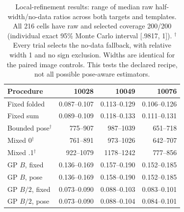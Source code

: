 \begin{table}[t]
\centering\scriptsize
\caption{Local-refinement results: range of median raw half-width/no-data ratios across both targets and templates. All 216 cells have raw and selected coverage 200/200 (individual exact 95\% Monte Carlo interval [.9817, 1]). $^\dagger$Every trial selects the no-data fallback, with relative width 1 and no sign exclusion. Widths are identical for the paired image controls. This tests the declared recipe, not all possible pose-aware estimators.}
\label{tab:refittingwidths}
\begin{tabular}{lrrr}
\toprule
Procedure & 10028 & 10049 & 10076 \\
\midrule
Fixed folded & 0.087--0.107 & 0.113--0.129 & 0.106--0.126 \\
Fixed sum & 0.089--0.109 & 0.118--0.133 & 0.111--0.131 \\
Bounded pose$^\dagger$ & 775--907 & 987--1039 & 651--718 \\
Mixed 0$^\dagger$ & 761--891 & 973--1026 & 642--707 \\
Mixed .1$^\dagger$ & 922--1079 & 1178--1242 & 777--856 \\
GP $B$, fixed & 0.136--0.169 & 0.157--0.190 & 0.152--0.185 \\
GP $B$, pose & 0.136--0.169 & 0.158--0.190 & 0.152--0.185 \\
GP $B/2$, fixed & 0.073--0.090 & 0.088--0.103 & 0.083--0.101 \\
GP $B/2$, pose & 0.073--0.090 & 0.088--0.104 & 0.084--0.101 \\
\bottomrule
\end{tabular}
\end{table}
